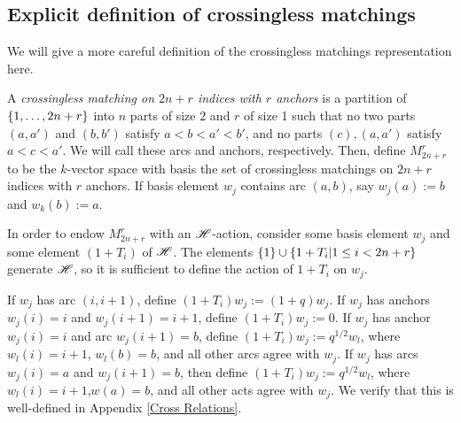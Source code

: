 \documentclass{amsart}
\begin{document}
\subsection{Explicit definition of crossingless matchings}\label{Explicit Definition}
We will give a more careful definition of the crossingless matchings representation here.
\begin{definition}
  A \emph{crossingless matching on $2n+r$ indices with $r$ anchors} is a partition of $\left\{ 1,\dots,2n+r \right\}$ into $n$ parts of size $2$ and $r$ of size 1 such that no two parts $(a,a')$ and $(b,b')$ satisfy $a < b < a' < b'$, and no parts $(c), (a,a')$ satisfy $a < c < a'$.
  We will call these arcs and anchors, respectively.
  Then, define $M^r_{2n+r}$ to be the $k$-vector space with basis the set of crossingless matchings on $2n+r$ indices with $r$ anchors.
  If basis element $w_j$ contains arc $(a,b)$, say $w_j(a) := b$ and $w_k(b) := a$.

  In order to endow $M^r_{2n + r}$ with an $\mathscr{H}$-action, consider some basis element $w_j$ and some element $(1 + T_i)$ of $\mathscr{H}$.
  The elements $\left\{ 1 \right\} \cup \left\{ 1 + T_i | 1 \leq i < 2n + r \right\}$ generate $\mathscr{H}$, so it is sufficient to define the action of $1 + T_i$ on $w_j$.

  If $w_j$ has arc $(i,i+1)$, define $(1 + T_i)w_j := (1 + q)w_j$.
  If $w_j$ has anchors $w_j(i) = i$ and $w_j(i+1) = i+1$, define $(1 + T_i)w_j := 0$.
  If $w_j$ has anchor $w_j(i) = i$ and arc $w_j(i+1) = b$, define $(1 + T_i)w_j := q^{1/2}w_l$, where $w_l(i) = i+1$, $w_l(b) = b$, and all other arcs agree with $w_j$.
  If $w_j$ has arcs $w_j(i) = a$ and $w_j(i+1) = b$, then define $(1 + T_i)w_j := q^{1/2}w_l$, where $w_l(i) = i+1$,$w(a) = b$, and all other acts agree with $w_j$. 
  We verify that this is well-defined in Appendix \ref{Cross Relations}.
\end{definition}
\end{document}
